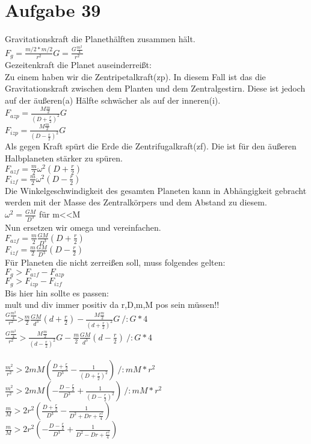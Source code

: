 \section{Aufgabe 39}
Gravitationskraft die Planethälften zusammen hält.\\
$F_g=\frac{m/2 * m/2}{r^2} G = \frac{G \frac{m^2}{4}}{r^2} $\\

Gezeitenkraft die Planet auseinderreißt:\\
Zu einem haben wir die Zentripetalkraft(zp). In diesem Fall ist das die Gravitationskraft zwischen dem Planten und dem Zentralgestirn. Diese ist jedoch auf der äußeren(a) Hälfte schwächer als auf der inneren(i). \\
$F_{azp} = \frac{M\frac{m}{2}}{(D+\frac{r}{2})^2}G $\\
$F_{izp} = \frac{M\frac{m}{2}}{(D-\frac{r}{2})^2}G $\\
Als gegen Kraft spürt die Erde die Zentrifugalkraft(zf). Die ist für den äußeren Halbplaneten stärker zu spüren.\\
$F_{azf} = \frac{m}{2}\omega^2(D + \frac{r}{2})$\\
$F_{izf} = \frac{m}{2}\omega^2(D - \frac{r}{2})$\\

Die Winkelgeschwindigkeit des gesamten Planeten kann in Abhängigkeit gebracht werden mit der Masse des Zentralkörpers und dem Abstand zu diesem.\\
$\omega^2 = \frac{G M}{D^3}$ für m<<M\\
Nun ersetzen wir omega und vereinfachen.\\
$F_{azf} = \frac{m}{2}\frac{G M}{D^3}(D + \frac{r}{2})$\\
$F_{izf} = \frac{m}{2}\frac{G M}{D^3}(D - \frac{r}{2})$\\

Für Planeten die nicht zerreißen soll, muss folgendes gelten:\\
$F_g > F_{azf} - F_{azp}$\\
$F_g > F_{izp} - F_{izf}$\\
Bis hier hin sollte es passen:\\
mult und div immer positiv da r,D,m,M pos sein müssen!!\\
$\frac{G\frac{m^2}{4}}{r^2}\text{>}\frac{m}{2}\frac{G M}{d^3}\left(d+\frac{r}{2}\right) - \frac{M \frac{m}{2}}{\left(d+\frac{r}{2}\right)^2}G ~ / :G *4$ \\
$\frac{G\frac{m^2}{4}}{r^2}> \frac{M \frac{m}{2}}{\left(d-\frac{r}{2}\right)^2}G-\frac{m}{2}\frac{G M}{d^3}\left(d-\frac{r}{2}\right) ~ / :G *4$\\
\\
$\frac{m^2}{r^2}>2 m M \left(\frac{D+\frac{r}{2}}{D^3}-\frac{1}{\left(D+\frac{r}{2}\right)^2}\right)~/:mM *r^2$ \\ 
$\frac{m^2}{r^2}>2 m M \left(-\frac{D-\frac{r}{2}}{D^3}+\frac{1}{\left(D-\frac{r}{2}\right)^2}\right)~/:mM *r^2$\\
$\frac{m}{M}>2 r^2 \left(\frac{D+\frac{r}{2}}{D^3}-\frac{1}{D^2+D r+\frac{r^2}{4}}\right)$ \\ 
$\frac{m}{M}>2 r^2 \left(-\frac{D-\frac{r}{2}}{D^3}+\frac{1}{D^2-D r+\frac{r^2}{4}}\right)$\\

